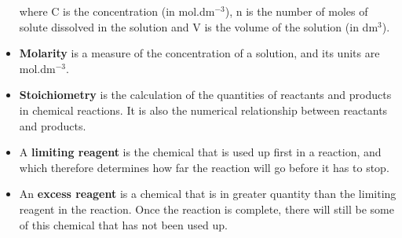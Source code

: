 \begin{itemize}
{where C is the concentration (in mol.dm$^{-3}$), n is the number of moles of solute dissolved in the solution and V is the volume of the solution (in dm$^{3}$).}
\item{\textbf{Molarity} is a measure of the concentration of a solution, and its units are mol.dm$^{-3}$.}
\item{\textbf{Stoichiometry} is the calculation of the quantities of reactants and products in chemical reactions. It is also the numerical relationship between reactants and products.}
\item{A \textbf{limiting reagent} is the chemical that is used up first in a reaction, and which therefore determines how far the reaction will go before it has to stop.}
\item{An \textbf{excess reagent} is a chemical that is in greater quantity than the limiting reagent in the reaction. Once the reaction is complete, there will still be some of this chemical that has not been used up.}
\end{itemize}
\pagebreak
